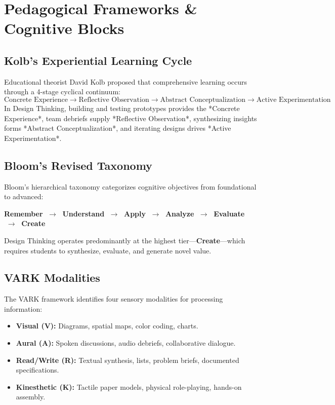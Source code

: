 \section{Pedagogical Frameworks \& Cognitive Blocks}

\subsection{Kolb's Experiential Learning Cycle}
Educational theorist David Kolb proposed that comprehensive learning occurs through a 4-stage cyclical continuum:
\begin{equation}
\text{Concrete Experience} \longrightarrow \text{Reflective Observation} \longrightarrow \text{Abstract Conceptualization} \longrightarrow \text{Active Experimentation}
\end{equation}
In Design Thinking, building and testing prototypes provides the *Concrete Experience*, team debriefs supply *Reflective Observation*, synthesizing insights forms *Abstract Conceptualization*, and iterating designs drives *Active Experimentation*.

\subsection{Bloom's Revised Taxonomy}
Bloom's hierarchical taxonomy categorizes cognitive objectives from foundational to advanced:
\begin{center}
\textbf{Remember} $\;\rightarrow\;$ \textbf{Understand} $\;\rightarrow\;$ \textbf{Apply} $\;\rightarrow\;$ \textbf{Analyze} $\;\rightarrow\;$ \textbf{Evaluate} $\;\rightarrow\;$ \textbf{Create}
\end{center}
Design Thinking operates predominantly at the highest tier---\textbf{Create}---which requires students to synthesize, evaluate, and generate novel value.

\subsection{VARK Modalities}
The VARK framework identifies four sensory modalities for processing information:
\begin{itemize}[leftmargin=1.2em, itemsep=2pt]
    \item \textbf{Visual (V):} Diagrams, spatial maps, color coding, charts.
    \item \textbf{Aural (A):} Spoken discussions, audio debriefs, collaborative dialogue.
    \item \textbf{Read/Write (R):} Textual synthesis, lists, problem briefs, documented specifications.
    \item \textbf{Kinesthetic (K):} Tactile paper models, physical role-playing, hands-on assembly.
\end{itemize}

